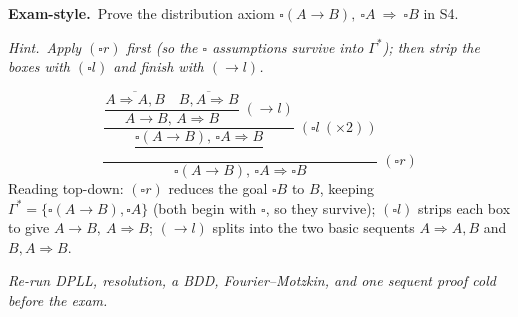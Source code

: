 \documentclass[11pt,a4paper]{article}
\newcommand{\hint}[1]{\par{\small\textcolor{accent}{\textit{Hint.}}\ \textit{#1}}\par\smallskip}
\newcommand{\exam}{\smallskip\textbf{\textcolor{warn}{Exam-style.}}\ }
\newcommand{\seq}{\Rightarrow}
\newcommand{\imp}{\rightarrow}
\newcommand{\rn}[1]{\;({#1})}
\begin{document}
\exam Prove the distribution axiom $\square(A\imp B),\ \square A\ \seq\ \square B$ in S4.
\hint{Apply $(\square r)$ \emph{first} (so the $\square$ assumptions survive into $\Gamma^{*}$); then strip the boxes with $(\square l)$ and finish with $(\imp l)$.}
\begin{sol}
\[
\frac{\dfrac{\dfrac{\overline{A\seq A,B}\quad \overline{B,A\seq B}}{A\imp B,\,A\seq B}\rn{\imp l}}
{\dfrac{\square(A\imp B),\,\square A\seq B}{\ }}\rn{\square l\ (\times2)}}
{\square(A\imp B),\,\square A\seq\square B}\rn{\square r}
\]
Reading top-down: $(\square r)$ reduces the goal $\square B$ to $B$, keeping $\Gamma^{*}=\{\square(A\imp B),\square A\}$ (both begin with $\square$, so they survive); $(\square l)$ strips each box to give $A\imp B,\ A\seq B$; $(\imp l)$ splits into the two basic sequents $A\seq A,B$ and $B,A\seq B$.
\end{sol}

\vspace{0.3cm}
\begin{center}\textit{Re-run DPLL, resolution, a BDD, Fourier--Motzkin, and one sequent proof cold before the exam.}\end{center}
\end{document}
